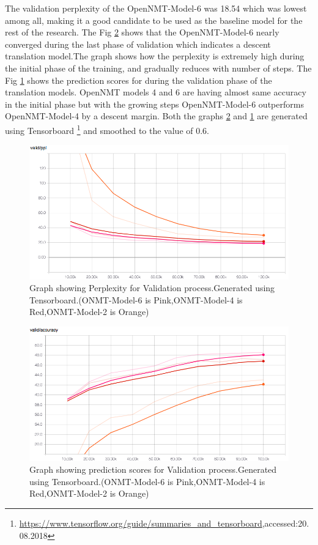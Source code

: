 The validation perplexity of the OpenNMT-Model-6 was 18.54 which was lowest among all, making it a good candidate to be used as the baseline model for the rest of the research. The Fig \ref{multibleu1} shows that the OpenNMT-Model-6 nearly converged during the last phase of validation which indicates a descent translation model.The graph shows how the perplexity is extremely high during the initial phase of the training, and gradually reduces with number of steps. The Fig \ref{multibleu2} shows the prediction scores for during the validation phase of the translation models. OpenNMT models 4 and 6 are having almost same accuracy in the initial phase but with the growing steps OpenNMT-Model-6 outperforms OpenNMT-Model-4 by a descent margin. Both the graphs \ref{multibleu1} and \ref{multibleu2} are generated using  Tensorboard \footnote{{\url{https://www.tensorflow.org/guide/summaries_and_tensorboard},accessed:20.08.2018}}  and smoothed to the value of 0.6. 

\begin{figure}[h]
\includegraphics[width=\textwidth]{graphs/graph1.png}
\caption{Graph showing Perplexity for Validation process.Generated using Tensorboard.(ONMT-Model-6 is Pink,ONMT-Model-4 is Red,ONMT-Model-2 is Orange)} 
\label{multibleu2}
\end{figure}

\begin{figure}[h]
\includegraphics[width=\textwidth]{graphs/graph2.png}
\caption{Graph showing prediction scores for Validation process.Generated using Tensorboard.(ONMT-Model-6 is Pink,ONMT-Model-4 is Red,ONMT-Model-2 is Orange)} 
\label{multibleu1}
\end{figure}


